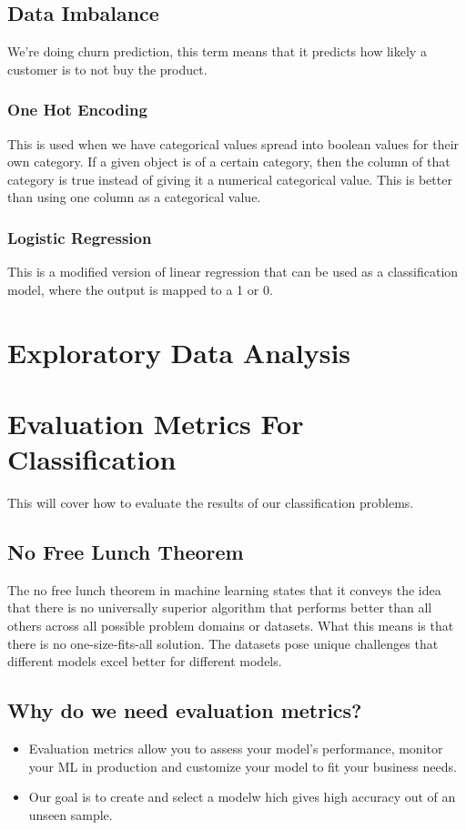 \documentclass[11pt]{article}
\begin{document}
\subsection{Data Imbalance}
\label{sec:org02cca51}
We're doing churn prediction, this term means that it predicts how likely a customer is to not buy the product.
\subsubsection{One Hot Encoding}
\label{sec:org2d4b62d}
This is used when we have categorical values spread into boolean values for their own category. If a given object is of a certain category, then the column of that category is true instead of giving it a numerical categorical value. This is better than using one column as a categorical value.
\subsubsection{Logistic Regression}
\label{sec:orga7124ba}
This is a modified version of linear regression that can be used as a classification model, where the output is mapped to a 1 or 0.
\section{Exploratory Data Analysis}
\label{sec:org1bf449e}
\section{Evaluation Metrics For Classification}
\label{sec:org0598e15}
This will cover how to evaluate the results of our classification problems.
\subsection{No Free Lunch Theorem}
\label{sec:org7d06569}
The no free lunch theorem in machine learning states that it conveys the idea that there is no universally superior algorithm that performs better than all others across all possible problem domains or datasets. What this means is that there is no one-size-fits-all solution. The datasets pose unique challenges that different models excel better for different models.
\subsection{Why do we need evaluation metrics?}
\label{sec:org779229a}
\begin{itemize}
\item Evaluation metrics allow you to assess your model's performance, monitor your ML in production and customize your model to fit your business needs.
\item Our goal is to create and select a modelw hich gives high accuracy out of an unseen sample.
\end{itemize}
\end{document}
